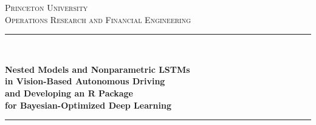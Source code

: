 \documentclass[11pt, notitlepage]{report}
\begin{document}
\begin{titlepage}

\newcommand{\HRule}{\rule{.8\linewidth}{0.5mm}} %
\renewenvironment{abstract}
 {\small
  \begin{center}
  \bfseries \abstractname\vspace{-.5em}\vspace{0pt}
  \end{center}
  \list{}{
    \setlength{\leftmargin}{.5cm}%
    \setlength{\rightmargin}{\leftmargin}%
  }%
  \item\relax}
 {\endlist}


\center %


\textsc{\LARGE Princeton University}\\[0.5cm] %
\textsc{\large Operations Research and Financial Engineering}\\[0.5cm] %

\vspace{2em}

\HRule \\[0.2cm]
{\Large \bfseries Nested Models and Nonparametric LSTMs\\
in Vision-Based Autonomous Driving\\
and Developing an R Package\\
for Bayesian-Optimized Deep Learning\\
\par}
\HRule \\[1.5cm]
 
\vspace{2em}


\end{titlepage}
\end{document}
